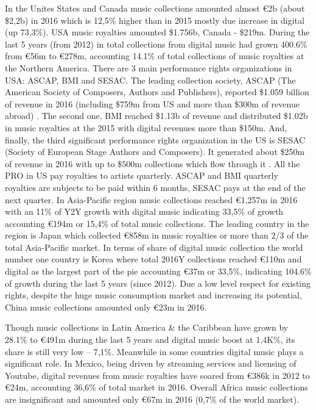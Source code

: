 \documentclass[12pt]{report}
\begin{document}
In the Unites States and Canada music collections amounted almost \euro 2b (about \$2,2b) in 2016 which is 12,5\% higher than in 2015 mostly due increase in digital (up 73,3\%). USA music royalties amounted \$1.756b, Canada - \$219m. During the last 5 years (from 2012) in total collections from digital music had grown 400.6\% from \euro 56m to \euro 278m, accounting 14.1\% of total collections of music royalties at the Northern America. There are 3 main performance rights organizations in USA: ASCAP, BMI and SESAC. The leading collection society, ASCAP (The American Society of Composers, Authors and Publishers), reported \$1.059 billion of revenue  in 2016 (including \$759m from US and more than \$300m of revenue abroad) . The second one, BMI reached \$1.13b of revenue and distributed \$1.02b in music royalties at the 2015  with digital revenues more than \$150m.  And, finally, the third significant performance rights organization in the US is SESAC (Society of European Stage Authors and Composers). It generated about \$250m of revenue in 2016 with up to \$500m collections which flow through it . All the PRO in US pay royalties to artists quarterly. ASCAP and BMI quarterly royalties are subjects to be paid within 6 months,  SESAC pays at the end of the next quarter.
In Asia-Pacific region music collections reached \euro 1,257m in 2016 with an 11\% of Y2Y growth with digital music indicating 33,5\% of growth accounting \euro 194m or 15,4\% of total music collections. The leading country in the region is Japan which collected \euro 858m in music royalties or more than 2/3  of the total Asia-Pacific market. In terms of share of digital music collection the world number one country is Korea where total 2016Y collections reached \euro 110m and digital as the largest part of the pie accounting \euro 37m or 33,5\%, indicating 104.6\% of growth during the last 5 years (since 2012). Due a low level respect for existing rights, despite the huge music consumption market and increasing its potential, China music collections amounted only \euro 23m in 2016.
 
Though music collections in Latin America \& the Caribbean have grown by 28.1\% to \euro 491m during the last 5 years and digital music boost at 1,4K\%, its share is still very low – 7,1\%.   Meanwhile in some countries digital music plays a significant role. In Mexico, being driven by streaming services and licensing of Youtube, digital revenues from music royalties have soared from \euro 386k in 2012 to \euro 24m, accounting 36,6\% of total market in 2016. Overall Africa music collections are insignificant and amounted only \euro 67m in 2016 (0,7\% of the world market).
 
\end{document}
